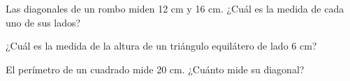 \documentclass[sin nombre,con autor]{plantilla-evaluacion-v1}
\begin{document}
\begin{preguntas}[resume=false]
  \pregunta Las diagonales de un rombo miden 12 cm y 16 cm. ¿Cuál es la medida de cada
  uno de sus lados?
  \begin{malla}[height=4.5cm]
  \end{malla}
  \begin{respuesta}[height=1.5cm]
  \end{respuesta}

  \pregunta ¿Cuál es la medida de la altura de un triángulo equilátero de lado 6 cm?
  \begin{malla}[height=4.5cm]
  \end{malla}
  \begin{respuesta}[height=1.5cm]
  \end{respuesta}

  \pregunta El perímetro de un cuadrado mide 20 cm. ¿Cuánto mide su diagonal?
  \begin{malla}[height=4.5cm]
  \end{malla}
  \begin{respuesta}[height=1.5cm]
  \end{respuesta}


\end{preguntas}
\end{document}
